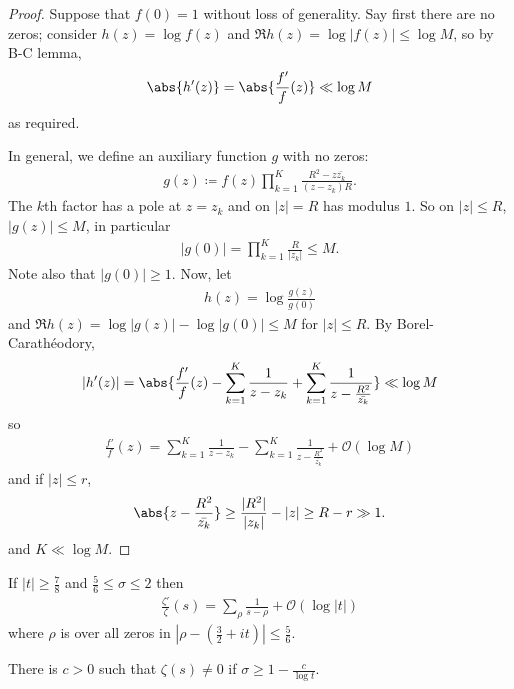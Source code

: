 \documentclass{article}
\newcommand{\1}{\mathbbm{1}}
\newcommand{\bigO}{\mathcal{O}}
\begin{document}
\begin{proof}
  Suppose that $f(0) = 1$ without loss of generality.
  Say first there are no zeros; consider $h(z) = \log f(z)$ and $\Re h(z) = \log |f(z)| \leq \log M$, so by B-C lemma,
  \begin{align*}
    \abs{h'(z)} = \abs{\frac{f'}{f}(z)} \ll \log M
  \end{align*}
  as required.

  In general, we define an auxiliary function $g$ with no zeros:
  \begin{align*}
    g(z) \coloneqq f(z) \prod_{k=1}^K \frac{R^2 - z \bar{z_k}}{(z-z_k) R}.
  \end{align*}
  The $k$th factor has a pole at $z=z_k$ and on $|z| = R$ has modulus $1$.
  So on $|z| \leq R$, $|g(z)| \leq M$, in particular
  \begin{align*}
    |g(0)| = \prod_{k=1}^K \frac{R}{|z_k|} \leq M.
  \end{align*}
  Note also that $|g(0)| \geq 1$.
  Now, let
  \begin{align*}
    h(z) = \log \frac{g(z)}{g(0)}
  \end{align*}
  and $\Re h(z) = \log |g(z)| - \log|g(0)| \leq M$ for $|z| \leq R$.
  By Borel-Carath\'eodory,
  \begin{align*}
    |h'(z)| = \abs{\frac{f'}{f}(z) - \sum_{k=1}^K \frac{1}{z-z_k} + \sum_{k=1}^K \frac{1}{z-\frac{R^2}{\bar{z_k}}}} \ll \log M
  \end{align*}
  so
  \begin{align*}
    \frac{f'}{f}(z) = \sum_{k=1}^K \frac{1}{z-z_k} - \sum_{k=1}^K \frac{1}{z-\frac{R^2}{\bar{z_k}}} + \bigO(\log M)
  \end{align*}
  and if $|z| \leq r$,
  \begin{align*}
    \abs{z-\frac{R^2}{\bar{z_k}}} \geq \frac{|R^2|}{|z_k|} - |z| \geq R - r \gg 1.
  \end{align*}
  and $K \ll \log M$.
\end{proof}
\begin{cor}
  If $|t| \geq \frac{7}{8}$ and $\frac{5}{6} \leq \sigma \leq 2$ then
  \begin{align*}
    \frac{\zeta'}{\zeta}(s) = \sum_\rho \frac{1}{s-\rho} + \bigO(\log |t|)
  \end{align*}
  where $\rho$ is over all zeros in $|\rho - (\frac{3}{2} + it)| \leq \frac{5}{6}$.
\end{cor}
\begin{thm}
  \newlec
  There is $c > 0$ such that $\zeta(s) \neq 0$ if $\sigma \geq 1 - \frac{c}{\log t}$.
\end{thm}
\end{document}

